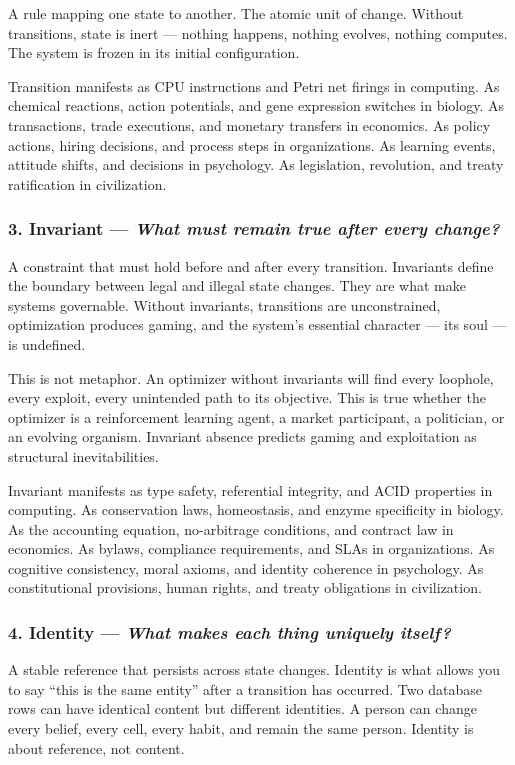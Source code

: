 \documentclass[11pt,a4paper]{article}
\newcommand{\question}[1]{\textit{#1}}
\begin{document}
A rule mapping one state to another. The atomic unit of change. Without transitions, state is inert --- nothing happens, nothing evolves, nothing computes. The system is frozen in its initial configuration.

Transition manifests as CPU instructions and Petri net firings in computing. As chemical reactions, action potentials, and gene expression switches in biology. As transactions, trade executions, and monetary transfers in economics. As policy actions, hiring decisions, and process steps in organizations. As learning events, attitude shifts, and decisions in psychology. As legislation, revolution, and treaty ratification in civilization.

\subsubsection{3. Invariant --- \question{What must remain true after every change?}}

A constraint that must hold before and after every transition. Invariants define the boundary between legal and illegal state changes. They are what make systems governable. Without invariants, transitions are unconstrained, optimization produces gaming, and the system's essential character --- its soul --- is undefined.

This is not metaphor. An optimizer without invariants will find every loophole, every exploit, every unintended path to its objective. This is true whether the optimizer is a reinforcement learning agent, a market participant, a politician, or an evolving organism. Invariant absence predicts gaming and exploitation as structural inevitabilities.

Invariant manifests as type safety, referential integrity, and ACID properties in computing. As conservation laws, homeostasis, and enzyme specificity in biology. As the accounting equation, no-arbitrage conditions, and contract law in economics. As bylaws, compliance requirements, and SLAs in organizations. As cognitive consistency, moral axioms, and identity coherence in psychology. As constitutional provisions, human rights, and treaty obligations in civilization.

\subsubsection{4. Identity --- \question{What makes each thing uniquely itself?}}

A stable reference that persists across state changes. Identity is what allows you to say ``this is the same entity'' after a transition has occurred. Two database rows can have identical content but different identities. A person can change every belief, every cell, every habit, and remain the same person. Identity is about reference, not content.
\end{document}
